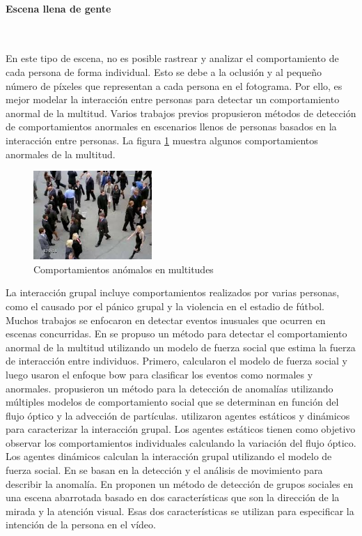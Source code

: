 \paragraph*{Escena llena de gente}\mbox{} \\
\label{parag:escena-llena-gente}

En este tipo de escena, no es posible rastrear y analizar el comportamiento de cada persona de forma individual. Esto se debe a la oclusión y al pequeño número de píxeles que representan a cada persona en el fotograma. Por ello, es mejor modelar la interacción entre personas para detectar un comportamiento anormal de la multitud. Varios trabajos previos propusieron métodos de detección de comportamientos anormales en escenarios llenos de personas basados en la interacción entre personas. La figura \ref{fig:abnormal-behaviors-crowded-scene} muestra algunos comportamientos anormales de la multitud.

\begin{figure}[ht]
\centering
\includegraphics[width=0.4\textwidth]{img/chapters/estado-del-arte/abnormal-behaviors-crowded-scene.jpg}
\caption{\label{fig:abnormal-behaviors-crowded-scene}Comportamientos anómalos en multitudes}
\end{figure}

La interacción grupal incluye comportamientos realizados por varias personas, como el causado por el pánico grupal y la violencia en el estadio de fútbol. Muchos trabajos se enfocaron en detectar eventos inusuales que ocurren en escenas concurridas. En \cite{5206641} se propuso un método para detectar el comportamiento anormal de la multitud utilizando un modelo de fuerza social que estima la fuerza de interacción entre individuos. Primero, calcularon el modelo de fuerza social y luego usaron el enfoque \gls{bow} para clasificar los eventos como normales y anormales. \cite{6202466} propusieron un método para la detección de anomalías utilizando múltiples modelos de comportamiento social que se determinan en función del flujo óptico y la advección de partículas. \cite{CHO201464} utilizaron agentes estáticos y dinámicos para caracterizar la interacción grupal. Los agentes estáticos tienen como objetivo observar los comportamientos individuales calculando la variación del flujo óptico. Los agentes dinámicos calculan la interacción grupal utilizando el modelo de fuerza social. En \cite{7019309} se basan en la detección y el análisis de movimiento para describir la anomalía. En \cite{6910023} proponen un método de detección de grupos sociales en una escena abarrotada basado en dos características que son la dirección de la mirada y la atención visual. Esas dos características se utilizan para especificar la intención de la persona en el vídeo.

